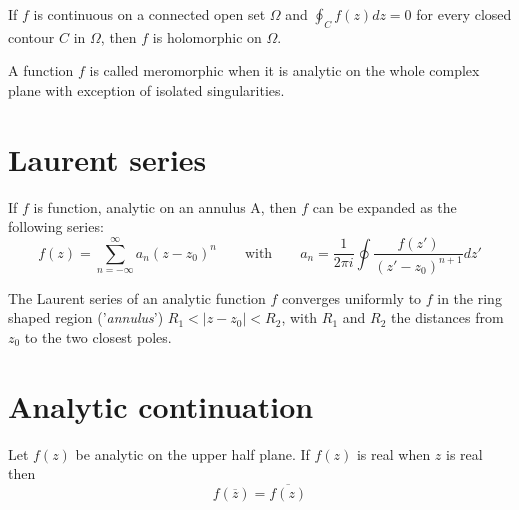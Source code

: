         \begin{theorem}
            If $f$ is continuous on a connected open set $\Omega$ and $\oint_C f(z) dz = 0$ for every closed contour $C$ in $\Omega$, then $f$ is holomorphic on $\Omega$.
		\end{theorem}
        
        \begin{definition}[Meromorphic]
			A function $f$ is called meromorphic when it is analytic on the whole complex plane with exception of isolated singularities. 
		\end{definition}
        
\section{Laurent series}
    	\begin{definition}
        	\label{complexcalculus:laurent_series}
            If $f$ is function, analytic on an annulus A, then $f$ can be expanded as the following series:
            \begin{equation}
                f(z) = \sum^{\infty}_{n=-\infty} a_n (z - z_0)^n \qquad \text{with} \qquad a_n = \frac{1}{2\pi i} \oint \frac{f(z')}{(z' - z_0)^{n+1}} dz'
			\end{equation}
		\end{definition}
        
        \begin{remark}
			The Laurent series of an analytic function $f$ converges uniformly to $f$ in the ring shaped region ('\textit{annulus}') $R_1 < |z - z_0| < R_2$, with $R_1$ and $R_2$ the distances from $z_0$ to the two closest poles.
        \end{remark}
        
        
\section{Analytic continuation}
	\begin{theorem}
		Let $f(z)$ be analytic on the upper half plane. If $f(z)$ is real when $z$ is real then
        \begin{equation}
        	f(\overline{z}) = \overline{f(z)}
        \end{equation}
	\end{theorem}
    
